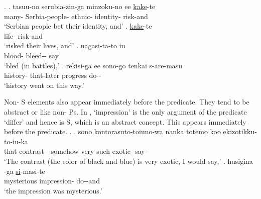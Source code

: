 \ex.\label{S00M0199_inoti}
 \ag. tasuu-no serubia-zin-ga minzoku-no ee  \ul{kake}-te \\
 	many- Serbia-people- ethnic-  identity- risk-and \\
	`Serbian people bet their identity, and'
 \bg.  \ul{kake}-te \\
 		life- risk-and \\
		`risked their lives, and'
 \bg.  \ul{nagasi}-ta-to iu \\
 		blood- bleed-- say \\
		`bled (in battles),'
 \bg. rekisi-ga ee sono-go tenkai s-are-masu \\
 	history-  that-later progress do-- \\
	`history went on this way.'

Non- S elements also appear immediately before the predicate.
They tend to be abstract or  like non- Ps.
In \Next,
 `impression' is the only argument of the predicate  `differ' and hence is S,
which is an abstract concept.
This appears immediately before the predicate.
%
\ex.\label{S00F0014_kanzi}
 \ag. sono kontorasuto-toiuno-wa nanka totemo koo ekizotikku-to-iu-ka \\
 	that contrast-- somehow very such exotic--say- \\
	`The contrast (the color of black and blue) is very exotic, I would say,'
 \bg. husigina -ga \ul{si}-masi-te \\
 		mysterious impression- do--and \\
		`the impression was mysterious.'
%

